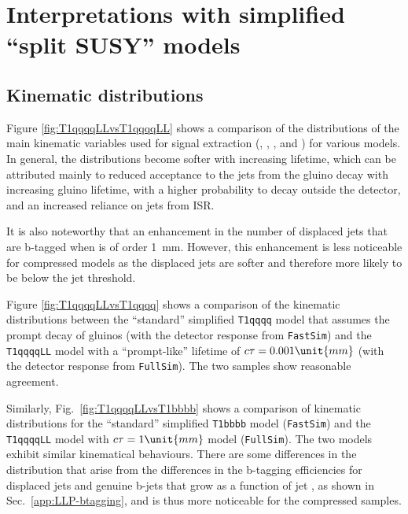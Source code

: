 \section{Interpretations with simplified ``split SUSY'' models}
\label{app:LLP}

\subsection{Kinematic distributions}
\label{app:LLP-distributions}

Figure \ref{fig:T1qqqqLLvsT1qqqqLL} shows a comparison of the
distributions of the main kinematic variables used for signal
extraction (\njet, \nb, \scalht, and \mht) for various \ctau
models. In general, the distributions become softer with increasing
lifetime, which can be attributed mainly to reduced acceptance to the
jets from the gluino decay with increasing gluino lifetime, with a
higher probability to decay outside the detector, and an increased
reliance on jets from ISR. 

It is also noteworthy that an enhancement in the number of displaced
jets that are b-tagged when \ctau is of order 1~mm. However, this
enhancement is less noticeable for compressed models as the displaced
jets are softer and therefore more likely to be below the jet \pt
threshold.

Figure \ref{fig:T1qqqqLLvsT1qqqq} shows a comparison of the kinematic
distributions between the ``standard'' simplified \texttt{T1qqqq}
model that assumes the prompt decay of gluinos (with the detector
response from \texttt{FastSim}) and the \texttt{T1qqqqLL} model with a
``prompt-like'' lifetime of $\ctau = 0.001\unit{mm}$ (with the
detector response from \texttt{FullSim}).  The two samples show
reasonable agreement.

Similarly, Fig.~\ref{fig:T1qqqqLLvsT1bbbb} shows a comparison of
kinematic distributions for the ``standard'' simplified
\texttt{T1bbbb} model (\texttt{FastSim}) and the \texttt{T1qqqqLL}
model with $\ctau = 1\unit{mm}$ model (\texttt{FullSim}). The two
models exhibit similar kinematical behaviours. There are some
differences in the \nb distribution that arise from the differences in
the b-tagging efficiencies for displaced jets and genuine b-jets that
grow as a function of jet \pt, as shown in
Sec.~\ref{app:LLP-btagging}, and is thus more noticeable for the
compressed samples.

